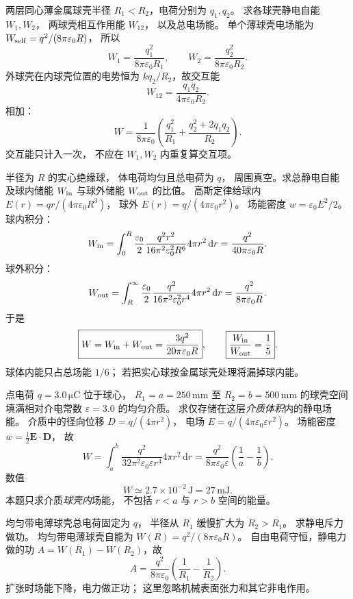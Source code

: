 两层同心薄金属球壳半径
$R_1<R_2$，电荷分别为 $q_1,q_2$。
求各球壳静电自能 $W_1,W_2$，
两球壳相互作用能 $W_{12}$，
以及总电场能。
\exsolution
单个薄球壳电场能为
$W_{\rm self}=q^2/(8\pi\varepsilon_0R)$，
所以
\[
\boxed{W_1=\frac{q_1^2}{8\pi\varepsilon_0R_1}},
\qquad
\boxed{W_2=\frac{q_2^2}{8\pi\varepsilon_0R_2}}.
\]
外球壳在内球壳位置的电势恒为
$kq_2/R_2$，故交互能
\[
\boxed{W_{12}=\frac{q_1q_2}{4\pi\varepsilon_0R_2}}.
\]
相加：
\[
\boxed{W=
\frac1{8\pi\varepsilon_0}
\left(\frac{q_1^2}{R_1}+
\frac{q_2^2+2q_1q_2}{R_2}\right)}.
\]
\excheck 交互能只计入一次，
不应在 $W_1,W_2$ 内重复算交互项。

半径为 $R$ 的实心绝缘球，
体电荷均匀且总电荷为 $q$，
周围真空。求总静电自能
及球内储能 $W_{\rm in}$ 与球外储能
$W_{\rm out}$ 的比值。
\exsolution
高斯定律给球内
$E(r)=qr/(4\pi\varepsilon_0R^3)$，
球外
$E(r)=q/(4\pi\varepsilon_0r^2)$。
场能密度
$w=\varepsilon_0E^2/2$。
球内积分：
\[
W_{\rm in}=\int_0^R
\frac{\varepsilon_0}{2}
\frac{q^2r^2}{16\pi^2\varepsilon_0^2R^6}
4\pi r^2\,\mathrm dr
=\frac{q^2}{40\pi\varepsilon_0R}.
\]
球外积分：
\[
W_{\rm out}=\int_R^\infty
\frac{\varepsilon_0}{2}
\frac{q^2}{16\pi^2\varepsilon_0^2r^4}
4\pi r^2\,\mathrm dr
=\frac{q^2}{8\pi\varepsilon_0R}.
\]
于是
\[
\boxed{W=W_{\rm in}+W_{\rm out}
=\frac{3q^2}{20\pi\varepsilon_0R}},
\qquad
\boxed{\frac{W_{\rm in}}{W_{\rm out}}=\frac15}.
\]
\excheck 球体内能只占总场能 $1/6$；
若把实心球按金属球壳处理将漏掉球内能。

点电荷 $q=3.0\,\mathrm{\mu C}$
位于球心，
$R_1=a=250\,\mathrm{mm}$ 至
$R_2=b=500\,\mathrm{mm}$ 的球壳空间
填满相对介电常数 $\varepsilon=3.0$
的均匀介质。
求仅存储在这层\emph{介质体积}内的静电场能。
\exsolution
介质中的径向位移
$D=q/(4\pi r^2)$，
电场
$E=q/(4\pi\varepsilon_0\varepsilon r^2)$。
场能密度
$w=\frac12\bm E\cdot\bm D$，
故
\[
W=\int_a^b \frac{q^2}
{32\pi^2\varepsilon_0\varepsilon r^4}
4\pi r^2\,\mathrm dr
=\frac{q^2}{8\pi\varepsilon_0\varepsilon}
\left(\frac1a-\frac1b\right).
\]
数值
\[
\boxed{W\simeq2.7\times10^{-2}\,\mathrm J
=27\,\mathrm{mJ}}.
\]
\excheck 本题只求介质\emph{球壳内}场能，
不包括 $r<a$ 与 $r>b$ 空间的能量。

均匀带电薄球壳总电荷固定为 $q$，
半径从 $R_1$ 缓慢扩大为 $R_2>R_1$。
求静电斥力做功。
\exsolution
均匀带电薄球壳自能为
$W(R)=q^2/(8\pi\varepsilon_0R)$。
自由电荷守恒，静电力做的功
$A=W(R_1)-W(R_2)$，故
\[
\boxed{A=\frac{q^2}{8\pi\varepsilon_0}
\left(\frac1{R_1}-\frac1{R_2}\right)}.
\]
\excheck 扩张时场能下降，电力做正功；
这里忽略机械表面张力和其它非电作用。

